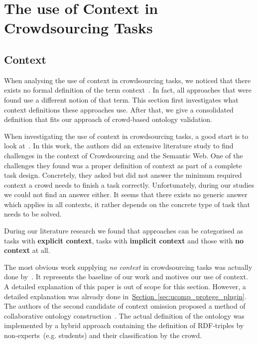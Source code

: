 \section{The use of Context in Crowdsourcing Tasks}
% 

\subsection{Context}
When analysing the use of context in crowdsourcing tasks, we noticed that there exists no formal definition of the term \guillemotright context\guillemotleft~. In fact, all approaches that were found use a different notion of that term. 
This section first investigates what context definitions these approaches use. After that, we give a consolidated definition that fits our approach of crowd-based ontology validation.

When investigating the use of context in crowdsourcing tasks, a good start is to look at~\cite{sarasua2015crowdsourcing}. In this work, the authors did an extensive literature study to find challenges in the context of Crowdsourcing and the Semantic Web. One of the challenges they found was a proper definition of context as part of a complete task design. Concretely, they asked but did not answer the minimum required context a crowd needs to finish a task correctly. Unfortunately, during our studies we could not find an answer either. It seems that there exists no generic answer which applies in all contexts, it rather depends on the concrete type of task that needs to be solved. 

During our literature research we found that approaches can be categorised as tasks with \textbf{explicit context}, tasks with \textbf{implicit context} and those with \textbf{no context} at all. 

The most obvious work supplying \emph{no context} in crowdsourcing tasks was actually done by~\cite{wohlgenannt2016}. It represents the baseline of our work and motives our use of context. A detailed explanation of this paper is out of scope for this section. However, a detailed explanation was already done in~\hyperref[sec:ucomp_protege_plugin]{Section~\ref*{sec:ucomp_protege_plugin}}. The authors of the second candidate of context omission proposed a method of collaborative ontology construction~\cite{zhitomirsky2017}. The actual definition of the ontology was implemented by a hybrid approach containing the definition of RDF-triples by non-experts~(e.g. students) and their classification by the crowd.

